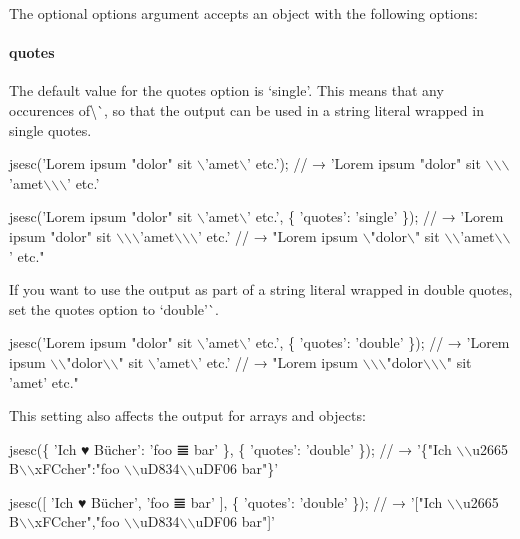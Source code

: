 The optional {\ttfamily options} argument accepts an object with the following options\+:

\paragraph*{{\ttfamily quotes}}

The default value for the {\ttfamily quotes} option is `\textquotesingle{}single'{\ttfamily . This means that any occurences of}\textbackslash{}\textquotesingle{}\`{}, so that the output can be used in a string literal wrapped in single quotes.


\begin{DoxyCode}
jsesc('Lorem ipsum "dolor" sit \(\backslash\)'amet\(\backslash\)' etc.');
// → 'Lorem ipsum "dolor" sit \(\backslash\)\(\backslash\)\(\backslash\)'amet\(\backslash\)\(\backslash\)\(\backslash\)' etc.'

jsesc('Lorem ipsum "dolor" sit \(\backslash\)'amet\(\backslash\)' etc.', \{
  'quotes': 'single'
\});
// → 'Lorem ipsum "dolor" sit \(\backslash\)\(\backslash\)\(\backslash\)'amet\(\backslash\)\(\backslash\)\(\backslash\)' etc.'
// → "Lorem ipsum \(\backslash\)"dolor\(\backslash\)" sit \(\backslash\)\(\backslash\)'amet\(\backslash\)\(\backslash\)' etc."
\end{DoxyCode}


If you want to use the output as part of a string literal wrapped in double quotes, set the {\ttfamily quotes} option to `\textquotesingle{}double'\`{}.


\begin{DoxyCode}
jsesc('Lorem ipsum "dolor" sit \(\backslash\)'amet\(\backslash\)' etc.', \{
  'quotes': 'double'
\});
// → 'Lorem ipsum \(\backslash\)\(\backslash\)"dolor\(\backslash\)\(\backslash\)" sit \(\backslash\)'amet\(\backslash\)' etc.'
// → "Lorem ipsum \(\backslash\)\(\backslash\)\(\backslash\)"dolor\(\backslash\)\(\backslash\)\(\backslash\)" sit 'amet' etc."
\end{DoxyCode}


This setting also affects the output for arrays and objects\+:


\begin{DoxyCode}
jsesc(\{ 'Ich ♥ Bücher': 'foo 𝌆 bar' \}, \{
  'quotes': 'double'
\});
// → '\{"Ich \(\backslash\)\(\backslash\)u2665 B\(\backslash\)\(\backslash\)xFCcher":"foo \(\backslash\)\(\backslash\)uD834\(\backslash\)\(\backslash\)uDF06 bar"\}'

jsesc([ 'Ich ♥ Bücher', 'foo 𝌆 bar' ], \{
  'quotes': 'double'
\});
// → '["Ich \(\backslash\)\(\backslash\)u2665 B\(\backslash\)\(\backslash\)xFCcher","foo \(\backslash\)\(\backslash\)uD834\(\backslash\)\(\backslash\)uDF06 bar"]'
\end{DoxyCode}


